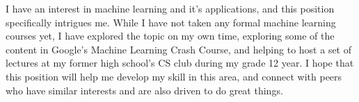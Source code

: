 \documentclass[11pt, letter]{awesome-cv}
\begin{document}
\begin{cvletter}
I have an interest in machine learning and it's applications,
and this position specifically intrigues me.
While I have not taken any formal machine learning courses yet,
I have explored the topic on my own time,
exploring some of the content in Google's Machine Learning Crash Course,
and helping to host a set of lectures at my former high school's CS club
during my grade 12 year.
I hope that this position will help me develop my skill in this area,
and connect with peers who have similar interests and are also driven to do great things.


\end{cvletter}
\end{document}
